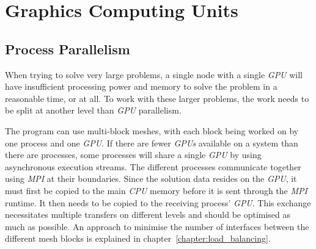 \chapter{Graphics Computing Units} \label{chapter:graphics_computing_units} 

\section{Process Parallelism} \label{section:process_parallelism}
When trying to solve very large problems, a single node with a single \textit{GPU} will have
insufficient processing power and memory to solve the problem in a reasonable time, or at all. To
work with these larger problems, the work needs to be split at another level than \textit{GPU}
parallelism. 

The program can use multi-block meshes, with each block being worked on by one process and one
\textit{GPU}. If there are fewer \textit{GPUs} available on a system than there are processes, some
processes will share a single \textit{GPU} by using asynchronous execution streams. The different
processes communicate together using \textit{MPI} at their boundaries. Since the solution data
resides on the \textit{GPU}, it must first be copied to the main \textit{CPU} memory before it is
sent through the \textit{MPI} runtime. It then needs to be copied to the receiving process'
\textit{GPU}. This exchange necessitates multiple transfers on different levels and should be
optimised as much as possible. An approach to minimise the number of interfaces between the
different mesh blocks is explained in chapter~\ref{chapter:load_balancing}.